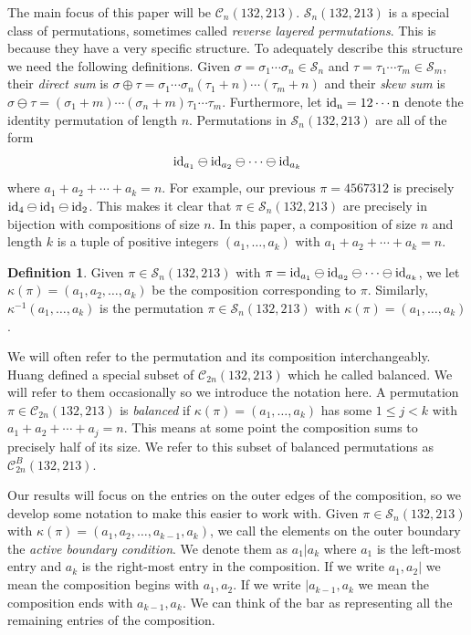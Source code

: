 \documentclass[11pt]{article}
\renewcommand\S{\mathcal S}
\newcommand\C{\mathcal C}
\theoremstyle{definition}
\newtheorem{definition}[theorem]{Definition}
\begin{document}
The main focus of this paper will be $\C_n(132,213)$. $\S_n(132,213)$ is a special class of permutations, sometimes called \emph{reverse layered permutations}. This is because they have a very specific structure. To adequately describe this structure we need the following definitions. Given $\sigma = \sigma_1 \cdots \sigma_n \in \S_n$ and $\tau = \tau_1 \cdots \tau_m \in \S_m$, their \textit{direct sum} is $\sigma \oplus \tau = \sigma_1 \cdots \sigma_n (\tau_1 + n) \cdots (\tau_m + n)$ and their \textit{skew sum} is $\sigma \ominus \tau = (\sigma_1 + m) \cdots (\sigma_n + m) \tau_1\cdots \tau_m$. Furthermore, let $\rm{id}_n = 12\cdots n$ denote the identity permutation of length $n$. Permutations in $\S_n(132,213)$ are all of the form
\[
{\rm id}_{a_1} \ominus {\rm id}_{a_2} \ominus \cdots \ominus {\rm id}_{a_k}
\]
where $a_1 + a_2 + \cdots + a_k = n$. For example, our previous $\pi = 4567312$ is precisely ${\rm id}_{4} \ominus {\rm id}_{1} \ominus {\rm id}_{2}$. This makes it clear that $\pi \in \S_n(132,213)$ are precisely in bijection with compositions of size $n$. In this paper, a composition of size $n$ and length $k$ is a tuple of positive integers $(a_1,\dots,a_k)$ with $a_1+a_2+\cdots+a_k = n$.

\begin{definition}
    Given $\pi \in \S_n(132,213)$ with $\pi = {\rm id}_{a_1} \ominus {\rm id}_{a_2} \ominus \cdots \ominus {\rm id}_{a_k}$, we let $\kappa(\pi) = (a_1,a_2,\dots,a_k)$ be the composition corresponding to $\pi$. Similarly, $\kappa^{-1}(a_1,\dots,a_k)$ is the permutation $\pi \in \S_n(132,213)$ with $\kappa(\pi)=(a_1,\dots,a_k)$.
\end{definition}

We will often refer to the permutation and its composition interchangeably. Huang \cite[Section 2.2]{H19} defined a special subset of $\C_{2n}(132,213)$ which he called balanced. We will refer to them occasionally so we introduce the notation here. A permutation $\pi \in \C_{2n}(132,213)$ is \emph{balanced} if $\kappa(\pi) = (a_1,\dots,a_k)$ has some $1 \le j < k$ with $a_1 + a_2 + \cdots + a_j = n$. This means at some point the composition sums to precisely half of its size. We refer to this subset of balanced permutations as $\C_{2n}^B(132,213)$.

Our results will focus on the entries on the outer edges of the composition, so we develop some notation to make this easier to work with. Given $\pi \in \S_n(132,213)$ with $\kappa(\pi) = (a_1,a_2,\dots,a_{k-1},a_k)$, we call the elements on the outer boundary the \emph{active boundary condition}. We denote them as $a_1|a_k$ where $a_1$ is the left-most entry and $a_k$ is the right-most entry in the composition. If we write $a_1,a_2|$ we mean the composition begins with $a_1,a_2$. If we write $|a_{k-1},a_k$ we mean the composition ends with $a_{k-1},a_k$. We can think of the bar as representing all the remaining entries of the composition. 
\end{document}
